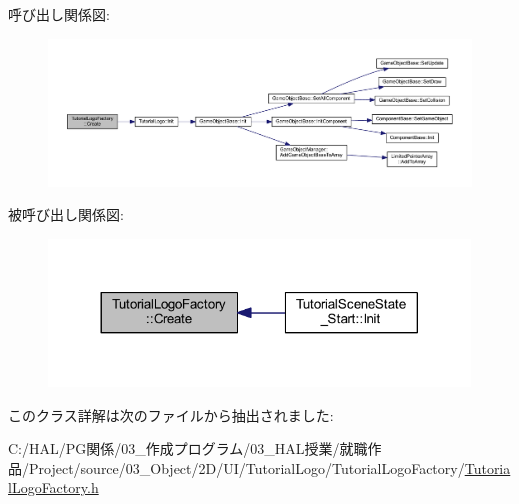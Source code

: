 呼び出し関係図\+:\nopagebreak
\begin{figure}[H]
\begin{center}
\leavevmode
\includegraphics[width=350pt]{class_tutorial_logo_factory_adc1e80456f8ab75ba30c7a1e9767afd8_cgraph}
\end{center}
\end{figure}
被呼び出し関係図\+:\nopagebreak
\begin{figure}[H]
\begin{center}
\leavevmode
\includegraphics[width=317pt]{class_tutorial_logo_factory_adc1e80456f8ab75ba30c7a1e9767afd8_icgraph}
\end{center}
\end{figure}


このクラス詳解は次のファイルから抽出されました\+:\begin{DoxyCompactItemize}
\item 
C\+:/\+H\+A\+L/\+P\+G関係/03\+\_\+作成プログラム/03\+\_\+\+H\+A\+L授業/就職作品/\+Project/source/03\+\_\+\+Object/2\+D/\+U\+I/\+Tutorial\+Logo/\+Tutorial\+Logo\+Factory/\mbox{\hyperlink{_tutorial_logo_factory_8h}{Tutorial\+Logo\+Factory.\+h}}\end{DoxyCompactItemize}
